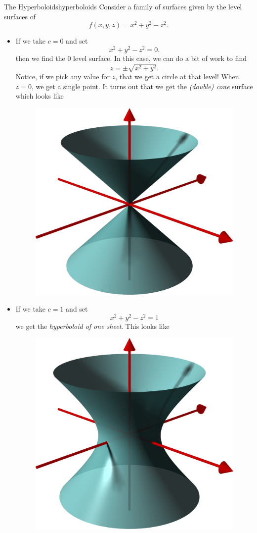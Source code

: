                 \begin{ex}{The Hyperboloids}{hyperboloids}
                Consider a family of surfaces given by the level surfaces of
                \[
                f(x,y,z)=x^2+y^2-z^2.
                \]
                \begin{itemize}
                    \item If we take $c=0$ and set
                    \[
                    x^2+y^2-z^2=0.
                    \]
                    then we find the 0 level surface. In this case, we can do a bit of work to find
                    \[
                    z=\pm \sqrt{x^2+y^2}.
                    \]
                    Notice, if we pick any value for $z$, that we get a circle at that level!  When $z=0$, we get a single point.  It turns out that we get the \emph{(double) cone} surface which looks like
                    \begin{figure}[H]
                        \centering
                     \includegraphics[width=.4\textwidth]{Figures_Part_6/cone_surface.png}
                    \end{figure}
                    
                    \item If we take $c=1$ and set
                    \[
                    x^2+y^2-z^2=1
                    \]
                    we get the \emph{hyperboloid of one sheet}.  This looks like
                    \begin{figure}[H]
                        \centering
                        \includegraphics[width=.4\textwidth]{Figures_Part_6/hyperboloid_1_sheet.png}
                    \end{figure}
                    

\end{itemize}
\end{ex}
